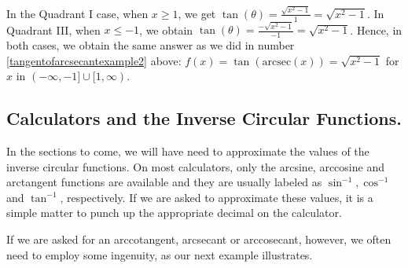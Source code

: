 \documentclass{ximera}
\begin{document}
\smallskip

In the Quadrant I case, when $x \geq 1$, we get $\tan(\theta)  = \frac{\sqrt{x^2-1}}{1} = \sqrt{x^2-1}$.  In Quadrant III, when $x \leq -1$, we obtain  $\tan(\theta)  = \frac{-\sqrt{x^2-1}}{-1} = \sqrt{x^2-1}$.   Hence, in both cases, we obtain the same answer as we did in number \ref{tangentofarcsecantexample2} above:  $f(x)  = \tan(\mbox{arcsec}(x)) = \sqrt{x^2-1}$ for $x$ in $(-\infty, -1] \cup [1, \infty)$.

\smallskip



\subsection{Calculators and the Inverse Circular Functions.}
\label{sectionarcstuffoncalc}

In the sections to come, we will have need to approximate the values of the inverse circular functions.  On most calculators, only the arcsine, arccosine and arctangent functions are available and they are usually labeled as $\sin^{-1}, \cos^{-1}$ and $\tan^{-1}$, respectively.  If we are asked to approximate these values, it is a simple matter to punch up the appropriate decimal on the calculator. 

\smallskip

If we are asked for an arccotangent, arcsecant or arccosecant, however, we often need to employ some ingenuity, as our next example illustrates.
\end{document}
